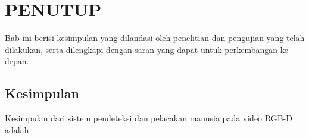 \chapter{PENUTUP}

%
\vspace{4.5pt}
\noindent Bab ini berisi kesimpulan yang dilandasi oleh penelitian dan pengujian yang telah dilakukan, serta dilengkapi dengan saran yang dapat untuk perkembangan ke depan.

\section{Kesimpulan}
\noindent Kesimpulan dari sistem pendeteksi dan pelacakan manusia pada video RGB-D adalah:
